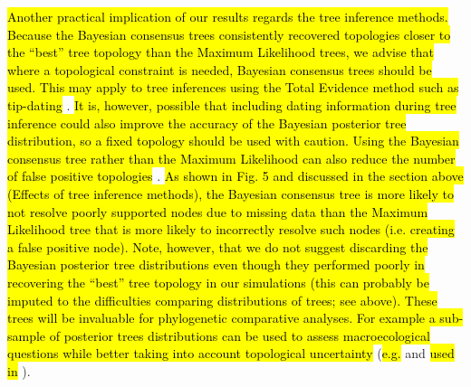 \documentclass[12pt,letterpaper]{article}
\begin{document}
\hl{Another practical implication of our results regards the tree inference methods.
Because the Bayesian consensus trees consistently recovered topologies closer to the ``best'' tree topology than the Maximum Likelihood trees, we advise that where a topological constraint is needed, Bayesian consensus trees should be used.
This may apply to tree inferences using the Total Evidence method such as tip-dating }\citep[\hl{e.g.}][]{ronquista2012,Wood01032013,BEASTmaster}.
\hl{It is, however, possible that including dating information during tree inference could also improve the accuracy of the Bayesian posterior tree distribution, so a fixed topology should be used with caution.
Using the Bayesian consensus tree rather than the Maximum Likelihood can also reduce the number of false positive topologies }\citep[\hl{sensu}][]{Swofford2001}.
\hl{As shown in Fig. 5 and discussed in the section above (Effects of tree inference methods), the Bayesian consensus tree is more likely to not resolve poorly supported nodes due to missing data than the Maximum Likelihood tree that is more likely to incorrectly resolve such nodes (i.e. creating a false positive node).
Note, however, that we do not suggest discarding the Bayesian posterior tree distributions even though they performed poorly in recovering the ``best'' tree topology in our simulations (this can probably be imputed to the difficulties comparing distributions of trees; see above).
These trees will be invaluable for phylogenetic comparative analyses.
For example a sub-sample of posterior trees distributions can be used to assess macroecological questions while better taking into account topological uncertainty }(\hl{e.g. }\citealt{fritzdiversity2013} and \citealt{jetzthe2012}\hl{ used in }\citealt{healy2014}).
\end{document}
